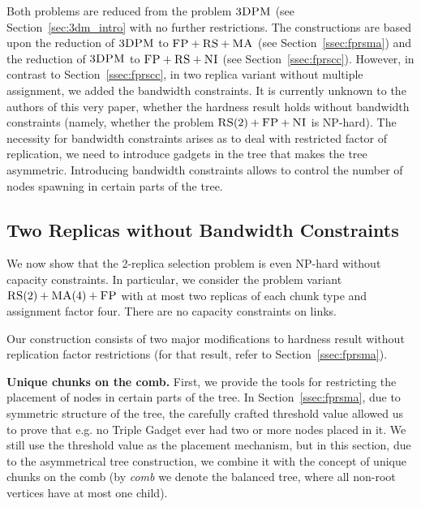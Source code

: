 Both problems are reduced from the problem $\textsc{3DPM}$ (see Section~\ref{sec:3dm_intro} with no further restrictions.
The constructions are based upon the reduction of $\textsc{3DPM}$ to $\textsc{FP}+\textsc{RS}+\textsc{MA}$ (see Section~\ref{ssec:fprsma}) and the reduction of $\textsc{3DPM}$ to $\textsc{FP}+\textsc{RS}+\textsc{NI}$ (see Section~\ref{ssec:fprscc}).
However, in contrast to Section~\ref{ssec:fprscc}, in two replica variant without multiple assignment, we added the bandwidth constraints.
It is currently unknown to the authors of this very paper, whether the hardness result holds without bandwidth constraints (namely, whether the problem $\textsc{RS}(2)+\textsc{FP}+\textsc{NI}$ is NP-hard).
The necessity for bandwidth constraints arises as to deal with restricted factor of replication, we need to introduce gadgets in the tree that makes the tree asymmetric.
Introducing bandwidth constraints allows to control the number of nodes spawning in certain parts of the tree.

\subsection{Two Replicas without Bandwidth Constraints}\label{ap:tworep-ma}

We now show that the 2-replica selection problem is even NP-hard
without capacity constraints.  In particular, we consider the problem
variant~$\textsc{RS}(2)+\textsc{MA}(4)+\textsc{FP}$ with at most two replicas of each chunk type and assignment factor
four. There are no capacity constraints on links.

Our construction consists of two major modifications to hardness result without replication factor restrictions (for that result, refer to Section~\ref{ssec:fprsma}).

\textbf{Unique chunks on the comb.} First, we provide the tools for restricting the placement of nodes in certain parts of the tree.
In Section~\ref{ssec:fprsma}, due to symmetric structure of the tree, the carefully crafted threshold value allowed us to prove that e.g. no Triple Gadget ever had two or more nodes placed in it.
We still use the threshold value as the placement mechanism, but in this section, due to the asymmetrical tree construction, we combine it with the concept of unique chunks on the comb (by \emph{comb} we denote the balanced tree, where all non-root vertices have at most one child).


